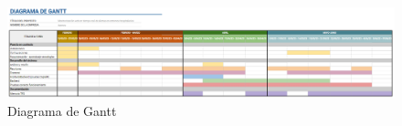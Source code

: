 
\begin{landscape}
    \begin{figure}[!ht]
        \centering
        \includegraphics[width=25cm]{Imagenes/Diagrama-Gantt.PNG}
        \caption{Diagrama de Gantt}
        \label{fig:gantt}
    \end{figure}
\end{landscape}



